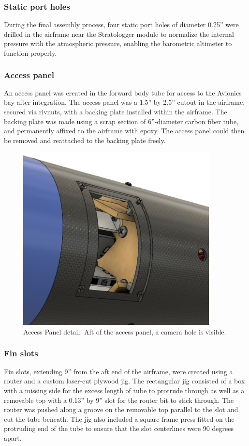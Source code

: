 \subsubsection*{Static port holes}
During the final assembly process, four static port holes of diameter 0.25” were drilled in the airframe near the Stratologger module to normalize the internal pressure with the atmospheric pressure, enabling the barometric altimeter to function properly.
\subsubsection*{Access panel}
An access panel was created in the forward body tube for access to the Avionics bay after integration. The access panel was a 1.5” by 2.5” cutout in the airframe, secured via rivnuts, with a backing plate installed within the airframe. The backing plate was made using a scrap section of 6”-diameter carbon fiber tube, and permanently affixed to the airframe with epoxy. The access panel could then be removed and reattached to the backing plate freely.
\begin{figure}[H]
	\centering
	\includegraphics[width=4in]{imgs/accesspaneldetail.png}
	\caption{Access Panel detail. Aft of the access panel, a camera hole is visible.}
	\label{fig:accesspanel}
\end{figure}
\subsubsection*{Fin slots}
Fin slots, extending 9” from the aft end of the airframe, were created using a router and a custom laser-cut plywood jig. The rectangular jig consisted of a box with a missing side for the excess length of tube to protrude through as well as a removable top with a 0.13” by 9” slot for the router bit to stick through. The router was pushed along a groove on the removable top parallel to the slot and cut the tube beneath. The jig also included a square frame press fitted on the protruding end of the tube to ensure that the slot centerlines were 90 degrees apart.

